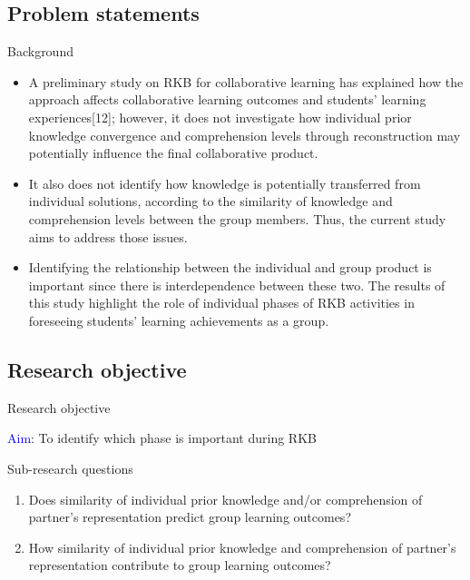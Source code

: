 \subsection{Problem statements}
\begin{frame}{Background}

\begin{itemize}
    \item A preliminary study on RKB for collaborative learning has explained how the approach affects collaborative learning outcomes and students’ learning experiences[12]; however, it does not investigate how individual prior knowledge convergence and comprehension levels through reconstruction may potentially influence the final collaborative product.
    \item It also does not identify how knowledge is potentially transferred from individual solutions, according to the similarity of knowledge and comprehension levels between the group members. Thus, the current study aims to address those issues.
    \item Identifying the relationship between the individual and group product is important since there is interdependence between these two. The results of this study highlight the role of individual phases of RKB activities in foreseeing students’ learning achievements as a group.
\end{itemize}
       
\end{frame}


\subsection{Research objective}
\begin{frame}{Research objective}

\textcolor<1>{blue}{Aim}: To identify which phase is important during RKB

\begin{block}{Sub-research questions}
    \begin{enumerate}
        \item Does similarity of individual prior knowledge and/or comprehension 
              of partner's representation predict group learning outcomes?
        \item How similarity of individual prior knowledge and comprehension
              of partner's representation contribute to group learning outcomes?
    \end{enumerate}
\end{block}
    
\end{frame}

